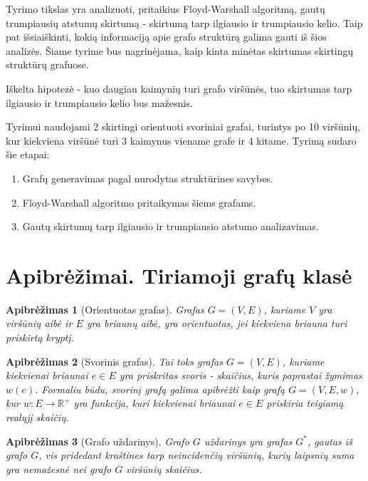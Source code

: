 \documentclass[bibliography=totoc]{article}
\newtheorem{definition}{Apibrėžimas}
\begin{document}
Tyrimo tikslas yra analizuoti, pritaikius Floyd-Warshall algoritmą, gautų trumpiausių atstumų skirtumą - skirtumą tarp ilgiausio ir trumpiausio kelio. Taip pat išsiaiškinti, kokią informaciją apie grafo struktūrą galima gauti iš šios analizės. Šiame tyrime bus nagrinėjama, kaip kinta minėtas skirtumas skirtingų struktūrų grafuose.



Iškelta hipotezė - kuo daugiau kaimynių turi grafo viršūnės, tuo skirtumas tarp ilgiausio ir trumpiausio kelio bus mažesnis.

Tyrimui naudojami 2 skirtingi orientuoti svoriniai grafai, turintys po 10 viršūnių, kur kiekviena viršūnė turi 3 kaimynus viename grafe ir 4 kitame. Tyrimą sudaro šie etapai:
\begin{enumerate}
    \item Grafų generavimas pagal nurodytas struktūrines savybes.
    \item Floyd-Warshall algoritmo pritaikymas šiems grafams.
    \item Gautų skirtumų tarp ilgiausio ir trumpiausio atstumo analizavimas.    
\end{enumerate}


\newpage
\section{Apibrėžimai. Tiriamoji grafų klasė}

\begin{definition}[Orientuotas grafas]
    Grafas $G = (V, E)$, kuriame $V$ yra viršūnių aibė ir $E$ yra briaunų aibė, yra orientuotas, jei kiekviena briauna turi priskirtą kryptį.
\end{definition}

\begin{definition}[Svorinis grafas]
Tai toks grafas $G=(V, E)$, kuriame kiekvienai briaunai $e \in E$ yra priskritas svoris - skaičius, kuris paprastai žymimas $w(e)$. Formaliu būdu, svorinį grafą galima apibrėžti kaip grafą $G = (V, E, w)$, kur $w: E \rightarrow \mathbb{R}^{+}$ yra funkcija, kuri kiekvienai briaunai $e \in E$ priskiria teigiamą realųjį skaičių.
\end{definition}


\begin{definition}[Grafo uždarinys]
    Grafo $G$ uždarinys yra grafas $G^*$, gautas iš grafo $G$, vis pridedant kraštines tarp neincidenčių viršūnių, kurių laipsnių suma yra nemažesnė nei grafo $G$ viršūnių skaičius.
\end{definition}
\end{document}

